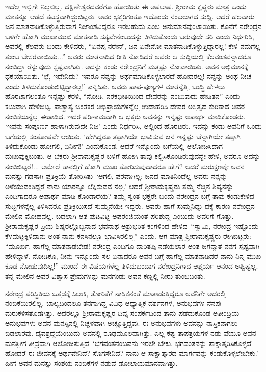 ಇದೆಲ್ಲ ಇಲ್ಲಿಗೇ ನಿಲ್ಲಲಿಲ್ಲ. ದಕ್ಷಿಣೇಶ್ವರದವರೆಗೂ ಹೋಯಿತು ಈ ಅಪಲಾಪ. ಶ್ರೀರಾಮ ಕೃಷ್ಣರು ಮಾತ್ರ ಒಂದು ಮಾತನ್ನೂ ಆಡದೆ ತಟಸ್ಥವಾಗಿದ್ದುಬಿಟ್ಟರು. ಅವರ ಭಕ್ತರಿಗಂತೂ ಇದೊಂದು ನಂಬಲಾಗದ ಸುದ್ದಿ. ಆದರೆ ಹಲವಾರು ಜನ ಮಾತನಾಡಿಕೊಳ್ಳುತ್ತಿರುವಾಗ ನಿಜಾಂಶವಿದ್ದರೂ ಇರಬಹುದು ಎಂಬ ಅನುಮಾನವುಂಟಾಯಿತು. ಕೊನೆಗೆ ನರೇಂದ್ರನ ಬಳಿಗೇ ಹೋಗಿ ಮುಖಾಮುಖಿ ಮಾತನಾಡಿ ಸತ್ಯವೇನೆಂಬುದನ್ನು ತಿಳಿದುಕೊಂಡು ಬರುವುದೇ ಸರಿ ಎಂದು ನಿರ್ಧರಿಸಿ, ಅವರಲ್ಲಿ ಕೆಲವರು ಬಂದು ಕೇಳಿದರು, “ಏನಪ್ಪ ನರೇನ್, ಜನ ಏನೇನೋ ಮಾತನಾಡಿಕೊಳ್ಳುತ್ತಿದ್ದಾರಲ್ಲ! ಕೇಳಿ ನಮಗೆಲ್ಲ ತುಂಬ ಬೇಸರವಾಯಿತು...” ಅವರು ಮಾತನಾಡಿದ ರೀತಿ ನೋಡಿದರೆ ಅವರು ಆ ಸುದ್ದಿಯಲ್ಲಿ ಕೆಲವಂಶವನ್ನಾದರೂ ನಂಬಿದ್ದಾ ರೆನ್ನುವುದು ಸ್ಪಷ್ಟವಾಗಿತ್ತು. ಅದನ್ನು ಕಂಡು ನರೇಂದ್ರನಿಗೆ ಮತ್ತಷ್ಟು ನೋವಾಯಿತು. ಅವನ ಅಭಿಮಾನಕ್ಕೆ ಧಕ್ಕೆಯಾಯಿತು. ‘ಛೆ, ಇದೇನಿದು? ಇವರೂ ನನ್ನನ್ನು ಅರ್ಥಮಾಡಿಕೊಳ್ಳಲಾರದೆ ಹೋದರಲ್ಲ! ನನ್ನನ್ನು ಅಂಥ ನೀಚ ಎಂದು ತಿಳಿದುಕೊಂಡುಬಿಟ್ಟಿದ್ದಾರಲ್ಲ!’ ಎನ್ನಿಸಿತು. ಅವರು ಪಾಪ-ಪುಣ್ಯಗಳ ಮಾತನ್ನೆತ್ತಿ, ಬುದ್ಧಿ ಹೇಳಲು ಹೊರಟಾಗಲಂತೂ ಇನ್ನಷ್ಟು ಕೆರಳಿ, “ನೋಡಿ, ನರಕಭೀತಿಯಿಂದ ದೇವರನ್ನು ನಂಬುವುದು ಹೇಡಿತನ” ಎಂದು ಕಟುವಾಗಿ ಹೇಳಿಬಿಟ್ಟ. ಪಾಶ್ಚಾತ್ಯ ಚಿಂತಕರ ಅಭಿಪ್ರಾಯಗಳನ್ನೆಲ್ಲ ಉದಾಹರಿಸಿ ದೇವರ ಅಸ್ತಿತ್ವದ ಕುರಿತಾದ ಅವರ ನಂಬಿಕೆಯನ್ನೆಲ್ಲ ಈಡಾಡಿದ. ಇದರ ಪರಿಣಾಮವಾಗಿ ಆ ಭಕ್ತರು ಅವನನ್ನು ಇನ್ನಷ್ಟು ಅಪಾರ್ಥ ಮಾಡಿಕೊಂಡರು. ‘ಇವನು ಸಂಪೂರ್ಣ ಹಾಳಾಗಿರುವುದೇ ನಿಜ’ ಎಂದು ನಿರ್ಧರಿಸಿ, ಅಲ್ಲಿಂದ ಹೊರಟರು. ಇದನ್ನು ಕಂಡು ಅವನಿಗೆ ಒಂದು ಬಗೆಯಲ್ಲಿ ಸಂತೋಷವೇ ಆಯಿತು. ‘ಹೇಗಿದ್ದರೂ ತಪ್ಪಾಗಿಯೇ ಭಾವಿಸುವ ಜನ ಇನ್ನಷ್ಟು ಚೆನ್ನಾಗಿಯೇ ತಪ್ಪಾಗಿ ತಿಳಿದುಕೊಂಡು ಹೋಗಲಿ, ಏನೀಗ!’ ಎಂದುಕೊಂಡ. ಆದರೆ ಇನ್ನೊಂದು ಬಗೆಯಲ್ಲಿ ಆಲೋಚಿಸಿದಾಗ ದುಃಖವುಕ್ಕಿಬಂತು. ಆ ಭಕ್ತರು ಶ್ರೀರಾಮಕೃಷ್ಣರ ಬಳಿಗೆ ಹೋಗಿ ತಾವು ಕಲ್ಪಿಸಿಕೊಂಡಿರುವುದನ್ನೇ ಹೇಳಿ, ಅವರೂ ಅದನ್ನು ನಂಬಿಬಿಟ್ಟರೆ!... ಆಮೇಲೆ ತಾನಲ್ಲಿಗೆ ಹೋಗಿ ಮುಖ ತೋರಿಸುವುದಾದರೂ ಹೇಗೆ? ಆದರೆ ಮರುಕ್ಷಣಕ್ಕೇ ಅವನ ಮನಸ್ಸು ಗಡಸಾಗಿ ಪ್ರತಿಕ್ರಿಯೆ ತೋರಿಸಿತು–‘ಆಗಲಿ, ಪರವಾಗಿಲ್ಲ; ಜನದ ಮಾತಿನಿಂದೆಲ್ಲ ಅವರು ನನ್ನನ್ನು ಅಳೆಯುವಂತಿದ್ದರೆ ನಾನು ಯಾರನ್ನೂ ಲೆಕ್ಕಿಸುವವ ನಲ್ಲ.’ ಆದರೆ ಶ್ರೀರಾಮಕೃಷ್ಣರು ತಮ್ಮ ನೆಚ್ಚಿನ ಶಿಷ್ಯನನ್ನು ಎಂದಿಗಾದರೂ ಅಪಾರ್ಥ ಮಾಡಿ ಕೊಂಡಾರೆಯೆ? ತಮ್ಮ ಸ್ವಂತ ಭಕ್ತರೇ ಬಂದು ನರೇಂದ್ರನ ಬಗ್ಗೆ ತಾವು ಕಂಡುಕೇಳಿದ ಸುದ್ದಿಗಳನ್ನೆಲ್ಲ ತಿಳಿಸಿದರೂ ಪ್ರತಿಕ್ರಿಯಿಸದೆ ಸುಮ್ಮನೆಯೇ ಇದ್ದರು. ಅವರು ಹಾಗೆ ಸುಮ್ಮನಿದ್ದು ದಕ್ಕೆ ಕಾರಣ ನರೇಂದ್ರನ ಮೇಲಿನ ಮೋಹವಲ್ಲ. ಬದಲಾಗಿ ಆತ ಪುಟವಿಟ್ಟ ಅಪರಂಜಿಯಂತೆ ಪರಿಶುದ್ಧ ಎಂಬುದು ಅವರಿಗೆ ಗೊತ್ತು. ಶ್ರೀರಾಮಕೃಷ್ಣರ ಪ್ರಿಯ ಶಿಷ್ಯರಲ್ಲೊಬ್ಬನಾದ ಭವನಾಥ ಅಶ್ರುಭರಿತ ಕಂಗಳಿಂದ ಹೇಳಿದ–“ಸ್ವಾಮಿ, ನರೇಂದ್ರ ಇಷ್ಟೊಂದು ಕೆಳಮಟ್ಟಕ್ಕಿಳಿದಾನು ಅಂತ ನಾನು ಕನಸಿನಲ್ಲೂ ಭಾವಿಸಿರಲಿಲ್ಲ” ಎಂದು. ಆಗ ಮಾತ್ರ ಶ್ರೀರಾಮಕೃಷ್ಣರು ರೇಗಿಬಿಟ್ಟರು: “ಮೂರ್ಖ, ಹಾಗೆಲ್ಲ ಮಾತನಾಡಬೇಡ! ನರೇಂದ್ರ ಎಂದಿಗೂ ದಾರಿತಪ್ಪಿ ನಡೆಯಲಾರ ಅಂತ ಜಗನ್ಮಾತೆ ನನಗೆ ಸ್ಪಷ್ಟವಾಗಿ ಹೇಳಿದ್ದಾಳೆ. ನೋಡಿಕೊ, ನೀನು ಇನ್ನೊಂದು ಸಲ ಏನಾದರೂ ಅವನ ಬಗ್ಗೆ ಹಾಗೆಲ್ಲ ಮಾತನಾಡಿದರೆ ನಾನು ನಿನ್ನ ಮುಖ ಕೂಡ ನೋಡುವುದಿಲ್ಲ!” ಮುಂದೆ ಈ ವಿಷಯಗಳೆಲ್ಲ ತಿಳಿದುಬಂದಾಗ ನರೇಂದ್ರನಿಗಾದ ಆಶ್ಚರ್ಯ-ಆನಂದ ಅಷ್ಟಿಷ್ಟಲ್ಲ. ತನ್ನ ಮೇಲಿನ ಅವರ ವಿಶ್ವಾಸ ಪ್ರೇಮಗಳನ್ನು ಮನಗಂಡು ಅವನ ಕಣ್ಣಲ್ಲಿ ನೀರು ತುಂಬಿಬಂತು.

ನರೇಂದ್ರ ಪರಿಸ್ಥಿತಿಯ ಒತ್ತಡಕ್ಕೆ ಸಿಲುಕಿ, ತೋರಿಕೆಗೆ ನಾಸ್ತಿಕನಂತೆ ಮಾತಾಡುತ್ತಿದ್ದರೂ ಅವನಿಗೇ ಅದರಲ್ಲಿ ನಂಬಿಕೆಯಿರಲಿಲ್ಲ. ಬಾಲ್ಯದಿಂದಲೂ ತನಗಾಗಿದ್ದ ವಿವಿಧ ಆಧ್ಯಾತ್ಮಿಕ ದರ್ಶನಗಳ, ಅನುಭವಗಳ ನೆನಪು ಮರುಕಳಿಸತೊಡಗಿತ್ತು. ಅದರಲ್ಲೂ ಶ್ರೀರಾಮಕೃಷ್ಣರ ದಿವ್ಯ ಸಂಪರ್ಕದಿಂದ ತಾನು ಪಡೆದುಕೊಂಡ ಅತೀಂದ್ರಿಯ ಅನುಭವಗಳು ಅವನ ಮನಸ್ಸಿನಲ್ಲಿ ನಿಚ್ಚಳವಾಗಿ ಅಚ್ಚೊತ್ತಿದ್ದವು. ಈ ಅನುಭವಗಳು ಅವನನ್ನು ನಾಸ್ತಿಕನಾಗಲು ಬಿಡಲಾರವು. ದೈವಶ್ರದ್ಧೆಯೆಂಬುದು ಅವನಲ್ಲಿ ರೂಢಮೂಲವಾಗಿತ್ತು. ಎಲ್ಲ ಕಷ್ಟ-ತಾಪತ್ರಯಗಳ ನಡು ವೆಯೂ ಅವನ ಮನಸ್ಸೀಗ ತೀವ್ರವಾಗಿ ಆಲೋಚಿಸುತ್ತಿದೆ–‘ಭಗವಂತನೆಂಬವನು ಇರಲೇ ಬೇಕು. ಭಗವಂತನನ್ನು ಸಾಕ್ಷಾತ್ಕರಿಸಿಕೊಳ್ಳದೆ ಹೋದರೆ ಈ ಜೀವನಕ್ಕೆ ಅರ್ಥವೇನಿದೆ? ಸೊಗಸೇನಿದೆ? ನಾನು ಆ ಸಾಕ್ಷಾತ್ಕಾರದ ಮಾರ್ಗವನ್ನು ಕಂಡುಕೊಳ್ಳಲೇಬೇಕು.’ ಹೀಗೆ ಅವನ ಮನಸ್ಸು ಸಂಶಯ ನಂಬಿಕೆಗಳ ನಡುವೆ ಡೋಲಾಯಮಾನವಾಗಿತ್ತು.

